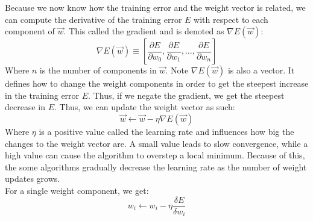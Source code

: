 Because we now know how the training error and the weight vector is related, we can compute the derivative of the training error $E$ with respect to each component of $\overrightarrow{w}$. This called the gradient and is denoted as $\nabla E(\overrightarrow{w})$:
\begin{equation}
    \nabla E(\overrightarrow{w}) \equiv \left [ \frac{\partial E}{\partial w_0}, \frac{\partial E}{\partial w_1}, \dots, \frac{\partial E}{\partial w_n} \right ]
\end{equation}
Where $n$ is the number of components in $\overrightarrow{w}$. Note $\nabla E(\overrightarrow{w})$ is also a vector. It defines how to change the weight components in order to get the steepest increase in the training error $E$. Thus, if we negate the gradient, we get the steepest decrease in $E$. Thus, we can update the weight vector as such:
\begin{equation}
    \overrightarrow{w} \gets \overrightarrow{w} - \eta \nabla E(\overrightarrow{w})
\end{equation}
Where $\eta$ is a positive value called the learning rate and influences how big the changes to the weight vector are.
A small value leads to slow convergence, while a high value can cause the algorithm to overstep a local minimum. Because of this, the some algorithms gradually decrease the learning rate as the number of weight updates grows.\\
For a single weight component, we get:
\begin{equation}
    \label{eq:weightcomponentupdate}
    w_i \gets w_i - \eta \frac{\delta E}{\delta w_i}
\end{equation}

